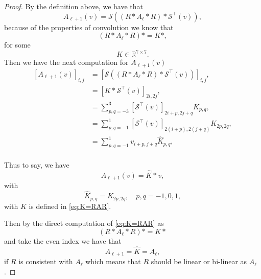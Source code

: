\begin{proof}
By the definition above, we have that
\begin{equation}
A_{\ell+1} (v) = \mathcal S\left( (R\ast A_{\ell} \ast R )\ast \mathcal S^\top(v) \right),
\end{equation}
because of the properties of convolution we know that 
\begin{equation}\label{eq:K=RAR}
(R\ast A_{\ell} \ast R )\ast = K \ast,
\end{equation}
for some 
$$
K \in \mathbb{R}^{7\times 7}.
$$
Then we have the next computation for $A_{\ell+1}(v)$
\begin{equation}\label{eq:compute_A}
\begin{aligned}
[A_{\ell+1} (v)]_{i,j} &= [\mathcal S\left( (R\ast A_{\ell} \ast R )\ast \mathcal S^\top(v) \right)]_{i,j}, \\
&= [ K\ast  \mathcal S^\top(v)]_{2i,2j}, \\
&= \sum_{p,q=-3}^{3} [\mathcal S^\top (v)]_{2i+p, 2j+q} K_{p,q}, \\
&= \sum_{p,q=-1}^1  [\mathcal S^\top (v)]_{2(i+p), 2(j+q)} K_{2p,2q}, \\
&= \sum_{p,q=-1}^1  v_{i+p, j+q} \hat K_{p,q}, \\
\end{aligned}
\end{equation}
	
Thus to say, we have
\begin{equation}
A_{\ell+1}(v) =  \hat K \ast v,
\end{equation}
with 
$$
\hat K_{p,q} = K_{2p,2q}, \quad p,q = -1,0,1,
$$
with $K$ is defined in \eqref{eq:K=RAR}.

Then by the direct computation of \eqref{eq:K=RAR} as 
$$
(R\ast A_{\ell} \ast R )\ast = K \ast
$$
and take the even index we have that
\begin{equation}
A_{\ell+1} = \hat K = A_\ell,
\end{equation}
if $R$ is consistent with $A_\ell$ which means that $R$ should be linear or bi-linear as $A_\ell$.	
\end{proof}
